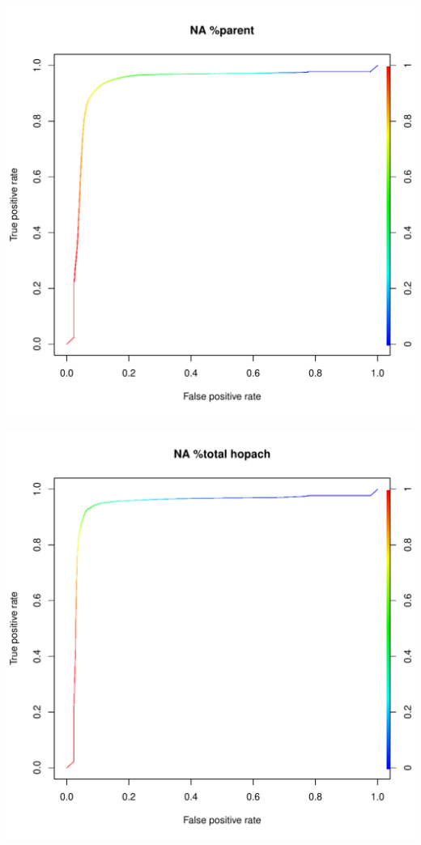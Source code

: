 \documentclass[11pt,a4paper,twoside]{report}\usepackage[]{graphicx}\usepackage[]{color}
\makeatletter
\def\maxwidth{ %
  \ifdim\Gin@nat@width>\linewidth
    \linewidth
  \else
    \Gin@nat@width
  \fi
}
\newenvironment{knitrout}{}{} %
\makeatother
\begin{document}
\begin{knitrout}
\includegraphics[width=\maxwidth]{figure/fig_code-15} 

\includegraphics[width=\maxwidth]{figure/fig_code-16} 


\end{knitrout}
\end{document}
